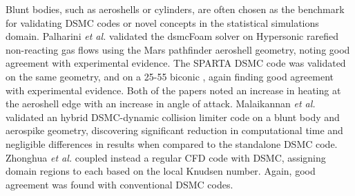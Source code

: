 Blunt bodies, such as aeroshells or cylinders, are often chosen as the benchmark for validating DSMC codes or novel concepts in the statistical simulations domain. Palharini \textit{et al.} \cite{pallahrini} validated the dsmcFoam solver on Hypersonic rarefied non-reacting gas flows using the Mars pathfinder aeroshell geometry, noting good agreement with experimental evidence. The SPARTA DSMC code was validated on the same geometry, and on a 25-\qty{55}{\deg} biconic \cite{spartavalid}, again finding good agreement with experimental evidence. Both of the papers noted an increase in heating at the aeroshell edge with an increase in angle of attack. Malaikannan \textit{et al.} \cite{malaikannan} validated an hybrid DSMC-dynamic collision limiter code on a blunt body and aerospike geometry, discovering significant reduction in computational time and negligible differences in results when compared to the standalone DSMC code. Zhonghua \textit{et al.} \cite{zhonghua} coupled instead a regular CFD code with DSMC, assigning domain regions to each based on the local Knudsen number. Again, good agreement was found with conventional DSMC codes.







